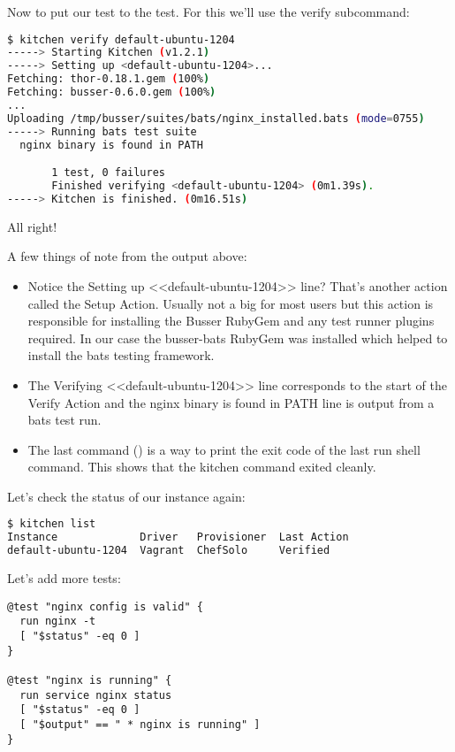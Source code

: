 Now to put our test to the test. For this we'll use the verify subcommand:

\begin{lstlisting}[language=Bash,label=lst:testing-test-kitchen15]
$ kitchen verify default-ubuntu-1204
-----> Starting Kitchen (v1.2.1)
-----> Setting up <default-ubuntu-1204>...
Fetching: thor-0.18.1.gem (100%)
Fetching: busser-0.6.0.gem (100%)
...
Uploading /tmp/busser/suites/bats/nginx_installed.bats (mode=0755)
-----> Running bats test suite
  nginx binary is found in PATH

       1 test, 0 failures
       Finished verifying <default-ubuntu-1204> (0m1.39s).
-----> Kitchen is finished. (0m16.51s)
\end{lstlisting}

All right!

A few things of note from the output above:

\begin{itemize}
  \item Notice the Setting up <<default-ubuntu-1204>> line? That's another action called the Setup Action. Usually not a big for most users but this action is responsible for installing the Busser RubyGem and any test runner plugins required. In our case the busser-bats RubyGem was installed which helped to install the bats testing framework.
  \item The Verifying <<default-ubuntu-1204>> line corresponds to the start of the Verify Action and the nginx binary is found in PATH line is output from a bats test run.
  \item The last command () is a way to print the exit code of the last run shell command. This shows that the kitchen command exited cleanly.
\end{itemize}

Let's check the status of our instance again:

\begin{lstlisting}[language=Bash,label=lst:testing-test-kitchen16]
$ kitchen list
Instance             Driver   Provisioner  Last Action
default-ubuntu-1204  Vagrant  ChefSolo     Verified
\end{lstlisting}

Let's add more tests:

\begin{lstlisting}[label=lst:testing-test-kitchen17]
@test "nginx config is valid" {
  run nginx -t
  [ "$status" -eq 0 ]
}

@test "nginx is running" {
  run service nginx status
  [ "$status" -eq 0 ]
  [ "$output" == " * nginx is running" ]
}
\end{lstlisting}





